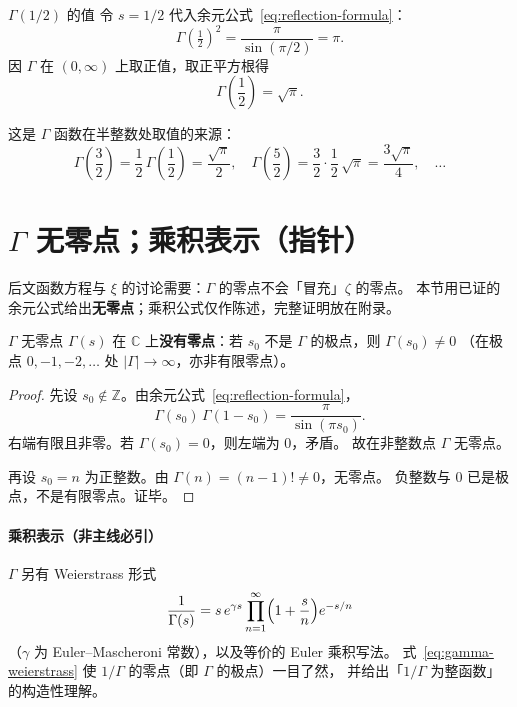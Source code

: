 \begin{corollary}{$\Gamma(1/2)$ 的值}{}\label{cor:gamma-half}
令 $s = 1/2$ 代入余元公式~\eqref{eq:reflection-formula}：
\[
\Gamma\!\left(\tfrac{1}{2}\right)^2 = \frac{\pi}{\sin(\pi/2)} = \pi.
\]
因 $\Gamma$ 在 $(0,\infty)$ 上取正值，取正平方根得
\[
\Gamma\!\left(\frac{1}{2}\right) = \sqrt{\pi}.
\]
\end{corollary}


这是 $\Gamma$ 函数在半整数处取值的来源：
\[
\Gamma\!\left(\frac{3}{2}\right) = \frac{1}{2}\,\Gamma\!\left(\frac{1}{2}\right) = \frac{\sqrt{\pi}}{2},\quad
\Gamma\!\left(\frac{5}{2}\right) = \frac{3}{2} \cdot \frac{1}{2}\,\sqrt{\pi} = \frac{3\sqrt{\pi}}{4},\quad \dots
\]


\section{\texorpdfstring{$\Gamma$}{Gamma} 无零点；乘积表示（指针）}\label{sec:weierstrass}

后文函数方程与 $\xi$ 的讨论需要：$\Gamma$ 的零点不会「冒充」$\zeta$ 的零点。
本节用已证的余元公式给出\textbf{无零点}；乘积公式仅作陈述，完整证明放在附录。

\begin{theorem}{$\Gamma$ 无零点}{}\label{cor:gamma-no-zeros}
$\Gamma(s)$ 在 $\mathbb{C}$ 上\textbf{没有零点}：若 $s_0$ 不是 $\Gamma$ 的极点，则 $\Gamma(s_0)\neq 0$
（在极点 $0,-1,-2,\ldots$ 处 $|\Gamma|\to\infty$，亦非有限零点）。
\end{theorem}

\begin{proof}
先设 $s_0\notin\mathbb{Z}$。由余元公式~\eqref{eq:reflection-formula}，
\[
  \Gamma(s_0)\,\Gamma(1-s_0)=\frac{\pi}{\sin(\pi s_0)}.
\]
右端有限且非零。若 $\Gamma(s_0)=0$，则左端为 $0$，矛盾。
故在非整数点 $\Gamma$ 无零点。

再设 $s_0=n$ 为正整数。由 $\Gamma(n)=(n-1)!\neq 0$，无零点。
负整数与 $0$ 已是极点，不是有限零点。证毕。
\end{proof}

\paragraph{乘积表示（非主线必引）}
$\Gamma$ 另有 Weierstrass 形式
\begin{equation}
\frac{1}{\Gamma(s)}
= s\, e^{\gamma s}
\prod_{n=1}^{\infty}\Bigl(1+\frac{s}{n}\Bigr)e^{-s/n}
\label{eq:gamma-weierstrass}
\end{equation}
（$\gamma$ 为 Euler--Mascheroni 常数），以及等价的 Euler 乘积写法。
式~\eqref{eq:gamma-weierstrass} 使 $1/\Gamma$ 的零点（即 $\Gamma$ 的极点）一目了然，
并给出「$1/\Gamma$ 为整函数」的构造性理解。

